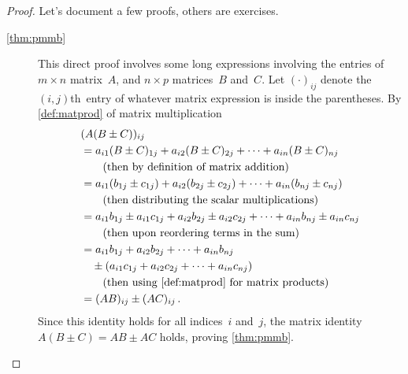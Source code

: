 \begin{proof} 
Let's document a few proofs, others are exercises.
\begin{description}
\item[\ref{thm:pmmb}]
This direct proof involves some long expressions involving the entries of \(m\times n\) matrix~\(A\), and \(n\times p\) matrices~\(B\) and~\(C\).
Let \((\cdot)_{ij}\) denote the \((i,j)\)th~entry of whatever matrix expression is inside the parentheses.
By \autoref{def:matprod} of matrix multiplication
\begin{align*}
&(A(B\pm C))_{ij}
\\&=a_{i1}(B\pm C)_{1j}+a_{i2}(B\pm C)_{2j}+\cdots+a_{in}(B\pm C)_{nj}
\\&\qquad(\text{then by definition of matrix addition})
\\&=a_{i1}(b_{1j}\pm c_{1j})+a_{i2}(b_{2j}\pm c_{2j})+\cdots+a_{in}(b_{nj}\pm c_{nj})
\\&\qquad(\text{then distributing the scalar multiplications})
\\&=a_{i1}b_{1j}\pm a_{i1}c_{1j}+a_{i2}b_{2j}\pm a_{i2}c_{2j}+\cdots+a_{in}b_{nj}\pm a_{in}c_{nj}
\\&\qquad(\text{then upon reordering terms in the sum})
\\&=a_{i1}b_{1j}+a_{i2}b_{2j}+\cdots+a_{in}b_{nj}
\\&\quad{}\pm (a_{i1}c_{1j}+ a_{i2}c_{2j}+\cdots +a_{in}c_{nj})
\\&\qquad(\text{then using \autoref{def:matprod} for matrix products})
\\&=(AB)_{ij} \pm (AC)_{ij}\,.
\end{align*}
Since this identity holds for all indices~\(i\) and~\(j\), the matrix identity \(A(B\pm C)=AB\pm AC\) holds, proving \autoref{thm:pmmb}.



\end{description}
\end{proof}
